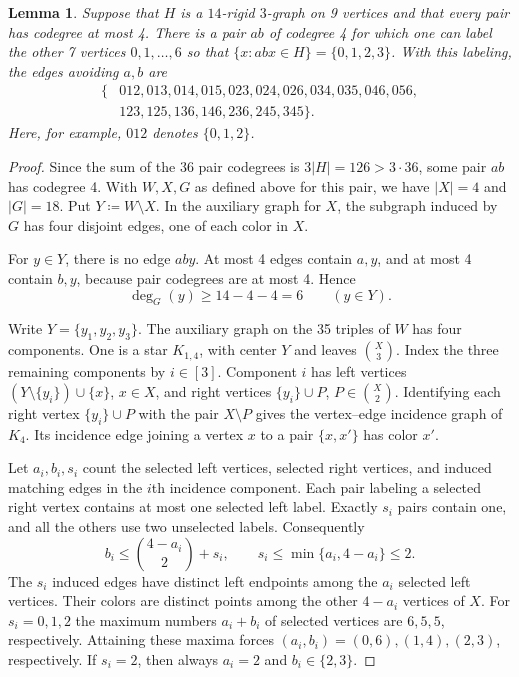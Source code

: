 \documentclass[10pt]{article}
\numberwithin{equation}{section}
\newtheorem{lemma}[lemma]{Lemma}
\theoremstyle{definition}
\begin{document}
\begin{lemma}\label{lem:four-neighborhood}
Suppose that $H$ is a $14$-rigid $3$-graph on 9 vertices and that every pair has codegree at most 4. There is a pair $ab$ of codegree 4 for which one can label the other 7 vertices $0,1,\ldots,6$ so that $\{x\colon abx\in H\}=\{0,1,2,3\}$. With this labeling, the edges avoiding $a,b$ are
\[
\begin{aligned}
 \{&012,013,014,015,023,024,026,034,035,046,056,\\
     &123,125,136,146,236,245,345\}.
\end{aligned}
\]
Here, for example, $012$ denotes $\{0,1,2\}$.
\end{lemma}
\begin{proof}
Since the sum of the 36 pair codegrees is $3|H|=126>3\cdot36$, some pair $ab$ has codegree 4. With $W,X,G$ as defined above for this pair, we have $|X|=4$ and $|G|=18$. Put $Y\coloneqq W\setminus X$. In the auxiliary graph for $X$, the subgraph induced by $G$ has four disjoint edges, one of each color in $X$.

For $y\in Y$, there is no edge $aby$. At most 4 edges contain $a,y$, and at most 4 contain $b,y$, because pair codegrees are at most 4. Hence
\begin{equation}
 \deg_G(y)\ge14-4-4=6\qquad(y\in Y).
 \label{eq:four-G-minimum-degrees}
\end{equation}

Write $Y=\{y_1,y_2,y_3\}$. The auxiliary graph on the 35 triples of $W$ has four components. One is a star $K_{1,4}$, with center $Y$ and leaves $\binom X3$. Index the three remaining components by $i\in[3]$. Component $i$ has left vertices $(Y\setminus\{y_i\})\cup\{x\}$, $x\in X$, and right vertices $\{y_i\}\cup P$, $P\in\binom X2$. Identifying each right vertex $\{y_i\}\cup P$ with the pair $X\setminus P$ gives the vertex--edge incidence graph of $K_4$. Its incidence edge joining a vertex $x$ to a pair $\{x,x'\}$ has color $x'$.

Let $a_i,b_i,s_i$ count the selected left vertices, selected right vertices, and induced matching edges in the $i$th incidence component. Each pair labeling a selected right vertex contains at most one selected left label. Exactly $s_i$ pairs contain one, and all the others use two unselected labels. Consequently
\begin{equation}
 b_i\le\binom{4-a_i}{2}+s_i,
 \qquad s_i\le\min\{a_i,4-a_i\}\le2.
 \label{eq:four-component-bound}
\end{equation}
The $s_i$ induced edges have distinct left endpoints among the $a_i$ selected left vertices. Their colors are distinct points among the other $4-a_i$ vertices of $X$. For $s_i=0,1,2$ the maximum numbers $a_i+b_i$ of selected vertices are $6,5,5$, respectively. Attaining these maxima forces $(a_i,b_i)=(0,6),(1,4),(2,3)$, respectively. If $s_i=2$, then always $a_i=2$ and $b_i\in\{2,3\}$.


\end{proof}
\end{document}

